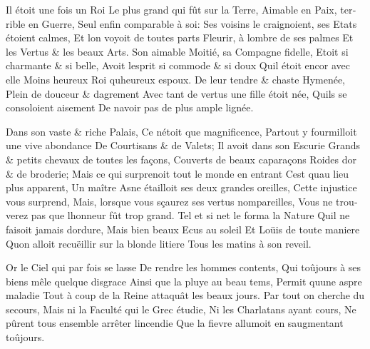 \documentclass[14pt,a4paper]{memoir}
\begin{document}
\begin{otherlanguage}{french}
{Il étoit une fois un Roi} {Le plus grand qui fût sur la Terre,}
{Aimable en Paix, terrible en Guerre,} {Seul enfin comparable à soi:}
{Ses voisins le craignoient, ses Etats étoient calmes,} {Et
l\textquotesingle on voyoit de toutes parts} {Fleurir, à
l\textquotesingle ombre de ses palmes} {Et les Vertus \& les beaux
Arts.} {Son aimable Moitié, sa Compagne fidelle,} {Etoit si charmante \&
si belle,} {Avoit l\textquotesingle esprit si commode \& si doux}
{Qu\textquotesingle il étoit encor avec elle} {Moins heureux Roi
qu\textquotesingle heureux espoux.} {De leur tendre \& chaste Hymenée,}
{Plein de douceur \& d\textquotesingle agrement} {Avec tant de vertus
une fille étoit née,} {Qu\textquotesingle ils se consoloient aisement}
{De n\textquotesingle avoir pas de plus ample lignée.}

{Dans son vaste \& riche Palais,} {Ce n\textquotesingle étoit que
magnificence,} {Partout y fourmilloit une vive abondance} {De Courtisans
\& de Valets;} {Il avoit dans son Escurie} {Grands \& petits chevaux de
toutes les façons, } {Couverts de beaux caparaçons} {Roides
d\textquotesingle or \& de broderie;} {Mais ce qui surprenoit tout le
monde en entrant } {C\textquotesingle est qu\textquotesingle au lieu
plus apparent,} {Un maître Asne étailloit ses deux grandes oreilles,}
{Cette injustice vous surprend,} {Mais, lorsque vous sçaurez ses vertus
nompareilles,} {Vous ne trouverez pas que l\textquotesingle honneur fût
trop grand.} {Tel et si net le forma la Nature} {Qu\textquotesingle il
ne faisoit jamais d\textquotesingle ordure,} {Mais bien beaux Ecus au
soleil} {Et Loüis de toute maniere} {Qu\textquotesingle on alloit
recuëillir sur la blonde litiere} {Tous les matins à son reveil.}

{Or le Ciel qui par fois se lasse} {De rendre les hommes contents,} {Qui
toûjours à ses biens mêle quelque disgrace} {Ainsi que la pluye au beau
tems,} {Permit qu\textquotesingle une aspre maladie} {Tout à coup de la
Reine attaquât les beaux jours. } {Par tout on cherche du secours,}
{Mais ni la Faculté qui le Grec étudie,} {Ni les Charlatans ayant
cours,} {Ne pûrent tous ensemble arrêter l\textquotesingle incendie}
{Que la fievre allumoit en s\textquotesingle augmentant toûjours. }


\end{otherlanguage}
\end{document}
